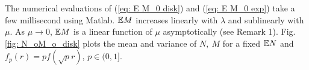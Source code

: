 The numerical evaluations of (\ref{eq: E M_0 disk})  and (\ref{eq: E M_0 exp}) take a few millisecond using Matlab. $\mathbb{E} M$ increases linearly with $\lambda$ and sublinearly with $\mu$. As $\mu\to0$, $\mathbb{E} M$ is a linear function of $\mu$ asymptotically (see Remark 1). 
Fig. \ref{fig: N_oM_o_disk} plots the mean and variance of $N,~M$ for a fixed $\mathbb{E} N$ and $f_p(r)= pf(\sqrt{p}r)$, $p\in(0,1]$. 


      